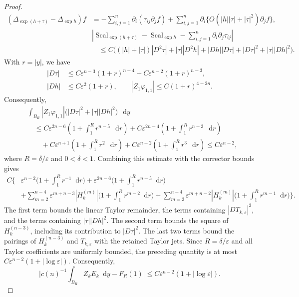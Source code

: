 \documentclass[11pt]{article}
\numberwithin{equation}{section}
\theoremstyle{remark}
\newcommand{\dd}{\mathop{}\!\mathrm{d}}
\begin{document}
\begin{proof}
{\begin{equation*}
\begin{aligned}
 (\Delta_{\exp(h+\tau)}-\Delta_{\exp h})f
 &=-\sum_{i,j=1}^n\partial_i(\tau_{ij}\partial_jf)
 +\sum_{i,j=1}^n\partial_i
 \bigl\{O(|h||\tau|+|\tau|^2)\partial_jf\bigr\},\\
 &\left|\operatorname{Scal}_{\exp(h+\tau)}
 -\operatorname{Scal}_{\exp h}
 -\sum_{i,j=1}^n\partial_i\partial_j\tau_{ij}\right|\\
 &\quad\le C\bigl((|h|+|\tau|)|D^2\tau|
          +|\tau||D^2h|+|Dh||D\tau|
          +|D\tau|^2+|\tau||Dh|^2\bigr).
\end{aligned}
\end{equation*}
}
With \(r=|y|\), we have
\[
 \begin{aligned}
 |D\tau|
 &\le C\varepsilon^{n-3}(1+r)^{n-4}
      +C\varepsilon^{n-2}(1+r)^{n-3},\\
 |Dh|&\le C\varepsilon^2(1+r),\qquad
 |Z_1\varphi_{1,1}|\le C(1+r)^{4-2n}.
 \end{aligned}
\]
Consequently,
\[
 \begin{aligned}
 &\int_{B_R}|Z_1\varphi_{1,1}|
 \bigl(|D\tau|^2+|\tau||Dh|^2\bigr)\,\dd y\\
 &\quad\le
 C\varepsilon^{2n-6}
 \left(1+\int_1^Rr^{n-5}\,\dd r\right)
 {}+C\varepsilon^{2n-4}
 \left(1+\int_1^Rr^{n-3}\,\dd r\right)\\
 &\qquad
 +C\varepsilon^{n+1}\left(1+\int_1^Rr^2\,\dd r\right)
 +C\varepsilon^{n+2}\left(1+\int_1^Rr^3\,\dd r\right)
 \le C\varepsilon^{n-2},
 \end{aligned}
\]
where \(R=\delta/\varepsilon\) and \(0<\delta<1\).
Combining this estimate with the corrector bounds gives
{
\begin{equation*}
\begin{aligned}
 C\biggl\{&\varepsilon^{n-2}
       \biggl(1+\int_1^Rr^{-1}\dd r\biggr)
 +\varepsilon^{2n-6}\biggl(1+\int_1^Rr^{n-5}\dd r\biggr)\\
 &+\sum_{m=2}^{n-4}\varepsilon^{m+n-3}|H_k^{(m)}|
       \biggl(1+\int_1^Rr^{m-2}\dd r\biggr)
 +\sum_{m=2}^{n-4}\varepsilon^{m+n-2}|H_k^{(m)}|
       \biggl(1+\int_1^Rr^{m-1}\dd r\biggr)\biggr\}.
\end{aligned}
\end{equation*}
}
The first term bounds the linear Taylor remainder, the terms containing
\(|DT_{k,\varepsilon}|^2\), and the terms containing
\(|\tau||Dh|^2\). The second term bounds the square of
\(H_k^{(n-3)}\), including its contribution to \(|D\tau|^2\).
The last two terms bound the pairings of \(H_k^{(n-3)}\) and
\(T_{k,\varepsilon}\) with the retained Taylor jets. Since
\(R=\delta/\varepsilon\)
and all Taylor coefficients are uniformly bounded,  the preceding
quantity is at most
$C\varepsilon^{n-2}(1+|\log\varepsilon|)$.  Consequently,
{
\begin{equation}\label{eq:actual-metric-tail}
 \big|c(n)^{-1}\int_{B_R}Z_kE_k\dd y-F_R(1)\big|
 \le C\varepsilon^{n-2}(1+|\log\varepsilon|).
\end{equation}
}


\end{proof}
\end{document}
